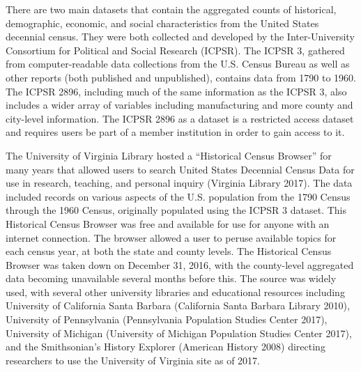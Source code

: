 \documentclass[11pt,]{article}
\begin{document}
There are two main datasets that contain the aggregated counts of
historical, demographic, economic, and social characteristics from the
United States decennial census. They were both collected and developed
by the Inter-University Consortium for Political and Social Research
(ICPSR). The ICPSR 3, gathered from computer-readable data collections
from the U.S. Census Bureau as well as other reports (both published and
unpublished), contains data from 1790 to 1960. The ICPSR 2896, including
much of the same information as the ICPSR 3, also includes a wider array
of variables including manufacturing and more county and city-level
information. The ICPSR 2896 as a dataset is a restricted access dataset
and requires users be part of a member institution in order to gain
access to it.

The University of Virginia Library hosted a ``Historical Census
Browser'' for many years that allowed users to search United States
Decennial Census Data for use in research, teaching, and personal
inquiry (Virginia Library 2017). The data included records on various
aspects of the U.S. population from the 1790 Census through the 1960
Census, originally populated using the ICPSR 3 dataset. This Historical
Census Browser was free and available for use for anyone with an
internet connection. The browser allowed a user to peruse available
topics for each census year, at both the state and county levels. The
Historical Census Browser was taken down on December 31, 2016, with the
county-level aggregated data becoming unavailable several months before
this. The source was widely used, with several other university
libraries and educational resources including University of California
Santa Barbara (California Santa Barbara Library 2010), University of
Pennsylvania (Pennsylvania Population Studies Center 2017), University
of Michigan (University of Michigan Population Studies Center 2017), and
the Smithsonian's History Explorer (American History 2008) directing
researchers to use the University of Virginia site as of 2017.
\end{document}
